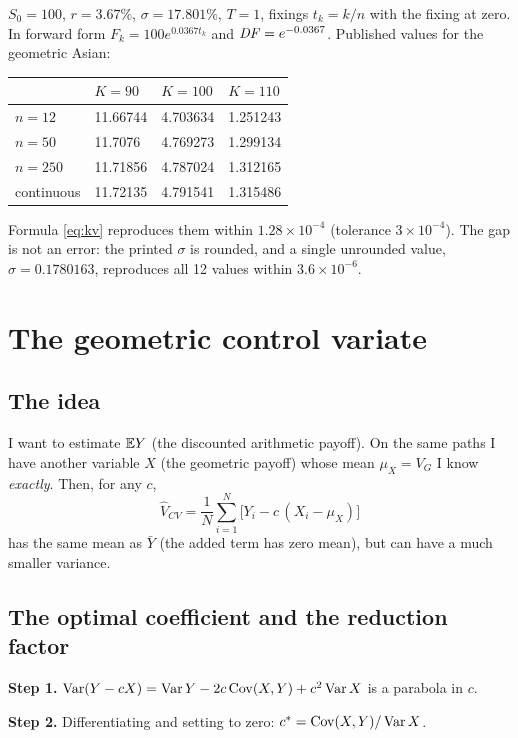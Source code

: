 \begin{esempio}[title={Example: Fusai--Meucci (2008)}]
$S_0=100$, $r=3.67\%$, $\sigma=17.801\%$, $T=1$, fixings $t_k=k/n$ with the fixing at zero. In forward form
$F_k=100e^{0.0367t_k}$ and $\mathit{DF}=e^{-0.0367}$. Published values for the geometric Asian:
\begin{center}
\small
\begin{tabular}{llll}
\toprule
& $K=90$ & $K=100$ & $K=110$\\
\midrule
$n=12$ & 11.66744 & 4.703634 & 1.251243\\
$n=50$ & 11.7076\phantom{0} & 4.769273 & 1.299134\\
$n=250$ & 11.71856 & 4.787024 & 1.312165\\
continuous & 11.72135 & 4.791541 & 1.315486\\
\bottomrule
\end{tabular}
\end{center}
Formula \eqref{eq:kv} reproduces them within $1.28\times10^{-4}$ (tolerance $3\times10^{-4}$). The gap is not an
error: the printed $\sigma$ is rounded, and a single unrounded value, $\sigma=0.1780163$, reproduces all 12 values
within $3.6\times10^{-6}$.
\end{esempio}

\section{The geometric control variate}
\subsection{The idea}
I want to estimate $\mathbb{E} Y$ (the discounted arithmetic payoff). On the same paths I have another variable $X$ (the
geometric payoff) whose mean $\mu_X=V_G$ I know \emph{exactly}. Then, for any $c$,
\begin{equation}\label{eq:cv}
\hat V_{CV}=\frac1N\sum_{i=1}^N\big[Y_i-c\,(X_i-\mu_X)\big]
\end{equation}
has the same mean as $\bar Y$ (the added term has zero mean), but can have a much smaller variance.

\subsection{The optimal coefficient and the reduction factor}
\noindent\textbf{Step 1.} $\operatorname{Var}(Y-cX)=\operatorname{Var} Y-2c\operatorname{Cov}(X,Y)+c^2\operatorname{Var} X$ is a parabola in $c$.

\noindent\textbf{Step 2.} Differentiating and setting to zero: $c^*=\operatorname{Cov}(X,Y)/\operatorname{Var} X$.

